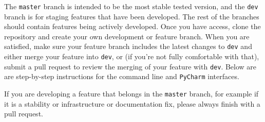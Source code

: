 The \verb|master| branch is intended to be the most stable tested version,
and the \verb|dev| branch is for staging features that have been developed.
The rest of the branches should contain features being actively developed.
Once you have access, clone the repository
and create your own development or feature branch.
When you are satisfied, make sure your feature branch 
includes the latest changes to \verb|dev|
and either merge your feature into \verb|dev|,
or (if you're not fully comfortable with that),
submit a pull request to review the merging of your feature with \verb|dev|.
Below are are step-by-step instructions
for the command line and \verb|PyCharm| interfaces.

If you are developing a feature that belongs in the \verb|master| branch,
for example if it is a stability or infrastructure or documentation fix,
please always finish with a pull request.
 \newline

